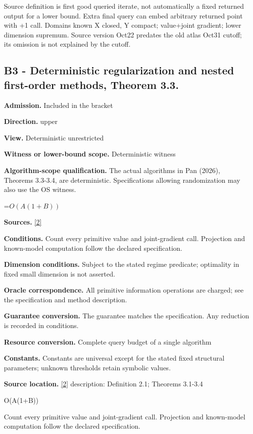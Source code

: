 \documentclass[10pt,a4paper]{article}
\newcommand{\AtlasMath}[1]{\par\begingroup\centering\setbox0=\hbox{$\displaystyle #1$}\ifdim\wd0>1.4\linewidth\typeout{ATLAS WIDE FORMULA: \the\wd0}\fi\ifdim\wd0>\linewidth\resizebox{\linewidth}{!}{\box0}\else\box0\fi\par\endgroup}
\begin{document}
Source definition is first good queried iterate, not automatically a fixed returned output for a lower bound. Extra final query can embed arbitrary returned point with +1 call. Domains known X closed, Y compact; value+joint gradient; lower dimension supremum. Source version Oct22 predates the old atlas Oct31 cutoff; its omission is not explained by the cutoff.

\subsection{B3 - Deterministic regularization and nested first-order methods, Theorem 3.3.}
\textbf{Admission.} Included in the bracket

\textbf{Direction.} upper

\textbf{View.} Deterministic unrestricted

\textbf{Witness or lower-bound scope.} Deterministic witness

\textbf{Algorithm-scope qualification.} The actual algorithms in Pan (2026), Theorems 3.3-3.4, are deterministic. Specifications allowing randomization may also use the OS witness.

\AtlasMath{O(A(1+B))}
\textbf{Sources.} \href{https://arxiv.org/pdf/2609.14235v2}{[2]}

\textbf{Conditions.} Count every primitive value and joint-gradient call. Projection and known-model computation follow the declared specification.

\textbf{Dimension conditions.} Subject to the stated regime predicate; optimality in fixed small dimension is not asserted.

\textbf{Oracle correspondence.} All primitive information operations are charged; see the specification and method description.

\textbf{Guarantee conversion.} The guarantee matches the specification. Any reduction is recorded in conditions.

\textbf{Resource conversion.} Complete query budget of a single algorithm

\textbf{Constants.} Constants are universal except for the stated fixed structural parameters; unknown thresholds retain symbolic values.

\textbf{Source location.} \href{https://arxiv.org/pdf/2609.14235v2}{[2]} description: Definition 2.1; Theorems 3.1-3.4

O(A(1+B))

Count every primitive value and joint-gradient call. Projection and known-model computation follow the declared specification.
\end{document}
